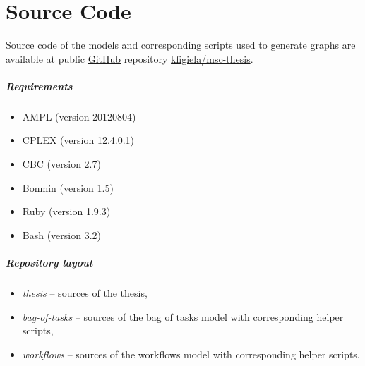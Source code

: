\chapter{Source Code} %

\label{AppendixA}

Source code of the models and corresponding scripts used to generate graphs are available at public \href{https://github.com}{GitHub} repository \href{https://github.com/kfigiela/msc-thesis}{kfigiela/msc-thesis}. 

\paragraph{Requirements}

\begin{itemize}
  \item AMPL (version 20120804)
  \item CPLEX (version 12.4.0.1)
  \item CBC (version 2.7)
  \item Bonmin (version 1.5)
  \item Ruby (version 1.9.3)
  \item Bash (version 3.2)
\end{itemize}

\paragraph{Repository layout}

\begin{itemize}
  \item \emph{thesis} -- sources of the thesis,
  \item \emph{bag-of-tasks} -- sources of the bag of tasks model with corresponding helper scripts,
  \item \emph{workflows} -- sources of the workflows model with corresponding helper scripts.
\end{itemize}
